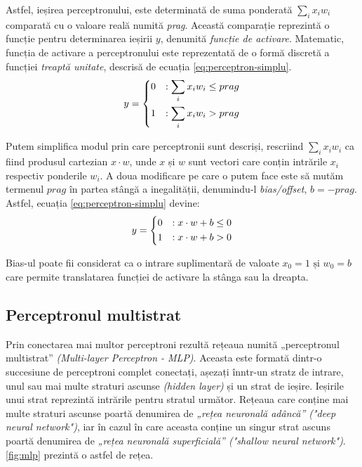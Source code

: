 Astfel, ieșirea perceptronului, este determinată de suma ponderată $\sum_i x_iw_i$ comparată cu o valoare reală numită \textit{prag}. Această comparație reprezintă o funcție pentru determinarea ieșirii $y$, denumită \textit{funcție de activare}. Matematic, funcția de activare a perceptronului este reprezentată de o formă discretă a funcției \textit{treaptă unitate}, descrisă de ecuația \eqref{eq:perceptron-simplu}.
\begin{equation}
y = 
	\begin{dcases}
	0 & : \sum_i x_iw_i \le prag\\
	1 & : \sum_i x_iw_i > prag
	\end{dcases}
\label{eq:perceptron-simplu}
\end{equation}

Putem simplifica modul prin care perceptronii sunt descriși, rescriind $\sum\nolimits_i x_iw_i$ ca fiind produsul cartezian $x \cdot w$, unde $x$ și $w$ sunt vectori care conțin intrările $x_i$ respectiv ponderile $w_i$. A doua modificare pe care o putem face este să mutăm termenul $prag$ în partea stângă a inegalității, denumindu-l \textit{bias/offset}, $b=-prag$. Astfel, ecuația \eqref{eq:perceptron-simplu} devine:
\begin{equation}
y = 
	\begin{dcases}
	0 & : x \cdot w + b \le 0\\
	1 & : x \cdot w + b > 0
	\end{dcases}
\label{eq:perceptron}
\end{equation}

Bias-ul poate fii considerat ca o intrare suplimentară de valoate $x_0 = 1 \text{ și } w_0 = b$ care permite translatarea funcției de activare la stânga sau la dreapta.

\subsection{Perceptronul multistrat}\label{subch:mlp}
Prin conectarea mai multor perceptroni rezultă rețeaua numită „perceptronul multistrat” \textit{(Multi-layer Perceptron - MLP)}. Aceasta este formată dintr-o succesiune de perceptroni complet conectați, așezați înntr-un stratz de intrare, unul sau mai multe straturi ascunse \textit{(hidden layer)} și un strat de ieșire. Ieșirile unui strat reprezintă intrările pentru stratul următor. Rețeaua care conține mai multe straturi ascunse poartă denumirea de \textit{„rețea neuronală adâncă” ("deep neural network")}, iar în cazul în care aceasta conține un singur strat ascuns poartă denumirea de \textit{„rețea neuronală superficială” ("shallow neural network")}. \autoref{fig:mlp} prezintă o astfel de rețea.

